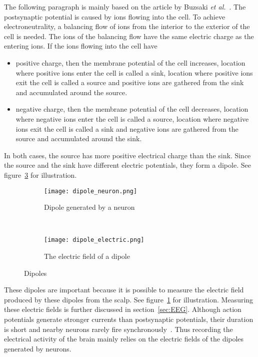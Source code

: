 The following paragraph is mainly based on the article by Buzsaki \textit{et al.}~\cite{electric_field}. The \gls{postsynaptic potential} is caused by ions flowing into the cell. To achieve electroneutrality, a balancing flow of ions from the interior to the exterior of the cell is needed. The ions of the balancing flow have the same electric charge as the entering ions. If the ions flowing into the cell have
\begin{itemize}
	\item positive charge, then 
	\subitem the \gls{membrane potential} of the cell increases,
	\subitem location where positive ions enter the cell is called a \gls{sink},
	\subitem location where positive ions exit the cell is called a \gls{source} and
	\subitem positive ions are gathered from the \gls{sink} and accumulated around the \gls{source}.
	\item negative charge, then
	\subitem the \gls{membrane potential} of the cell decreases,
	\subitem location where negative ions enter the cell is called a \gls{source},
	\subitem location where negative ions exit the cell is called a \gls{sink} and
	\subitem negative ions are gathered from the \gls{source} and accumulated around the \gls{sink}.
\end{itemize}

In both cases, the \gls{source} has more positive electrical charge than the \gls{sink}. Since the \gls{source} and the \gls{sink} have different electric potentials, they form a \gls{dipole}. See figure~\ref{fig:dipole} for illustration.

\begin{figure}[h!]
	\centering
	\begin{subfigure}{0.48\textwidth}
		\texttt{[image: dipole\_neuron.png]}
		\caption{Dipole generated by a neuron~\cite[p.~669]{neuroscience}}
		\label{fig:dipole_neuron}
	\end{subfigure}
	~
	\begin{subfigure}{0.48\textwidth}
		\texttt{[image: dipole\_electric.png]}
		\caption{The electric field of a dipole\protect\footnotemark}
		\label{fig:dipole_electric}
	\end{subfigure}
	\caption{Dipoles}
	\label{fig:dipole}
\end{figure}

These \glspl{dipole} are important because it is possible to measure the electric field produced by these \glspl{dipole} from the scalp. See figure~\ref{fig:dipole_neuron} for illustration. Measuring these electric fields is further discussed in section~\ref{sec:EEG}. Although \glspl{action potential} generate stronger currents than \glspl{postsynaptic potential}, their duration is short and nearby \glspl{neuron} rarely fire synchronously~\cite{electric_field}. Thus recording the electrical activity of the brain mainly relies on the electric fields of the \glspl{dipole} generated by \glspl{neuron}.


